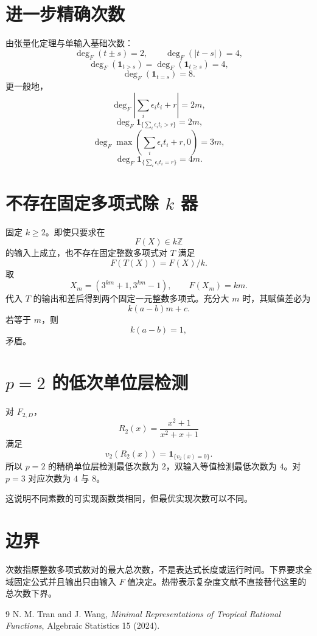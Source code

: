 \documentclass[11pt,a4paper]{ctexart}
\begin{document}
\section{进一步精确次数}
由张量化定理与单输入基础次数：
\[
\deg_F(t\pm s)=2,
\qquad
\deg_F(|t-s|)=4,
\]
\[
\deg_F(\mathbf1_{t>s})
=
\deg_F(\mathbf1_{t\ge s})
=
4,
\]
\[
\deg_F(\mathbf1_{t=s})=8.
\]
更一般地，
\[
\deg_F\left|\sum_i\epsilon_it_i+r\right|=2m,
\]
\[
\deg_F\mathbf1_{\{\sum_i\epsilon_it_i>r\}}=2m,
\]
\[
\deg_F\max\left(\sum_i\epsilon_it_i+r,0\right)=3m,
\]
\[
\deg_F\mathbf1_{\{\sum_i\epsilon_it_i=r\}}=4m.
\]

\section{不存在固定多项式除 \(k\) 器}
固定 \(k\ge2\)。即使只要求在
\[
F(X)\in k\mathbb Z
\]
的输入上成立，也不存在固定整数多项式对 \(T\) 满足
\[
F(T(X))=F(X)/k.
\]
取
\[
X_m=(3^{km}+1,3^{km}-1),
\qquad F(X_m)=km.
\]
代入 \(T\) 的输出和差后得到两个固定一元整数多项式。充分大 \(m\) 时，其赋值差必为
\[
k(a-b)m+c.
\]
若等于 \(m\)，则
\[
k(a-b)=1,
\]
矛盾。

\section{\(p=2\) 的低次单位层检测}
对 \(F_{2,D}\)，
\[
R_2(x)=\frac{x^2+1}{x^2+x+1}
\]
满足
\[
\boxed{
v_2(R_2(x))
=
\mathbf1_{\{v_2(x)=0\}}.
}
\]
所以 \(p=2\) 的精确单位层检测最低次数为 \(2\)，双输入等值检测最低次数为 \(4\)。对 \(p=3\) 对应次数为 \(4\) 与 \(8\)。

这说明不同素数的可实现函数类相同，但最优实现次数可以不同。

\section{边界}
次数指原整数多项式数对的最大总次数，不是表达式长度或运行时间。下界要求全域固定公式并且输出只由输入 \(F\) 值决定。热带表示复杂度文献不直接替代这里的总次数下界。

\begin{thebibliography}{9}
 N. M. Tran and J. Wang, \emph{Minimal Representations of Tropical Rational Functions}, Algebraic Statistics 15 (2024).
\end{thebibliography}
\end{document}
